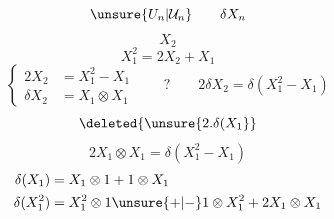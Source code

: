 \[\unsure{U_n|\mathcal U_n}\qquad\delta X_n\]
\[X_2\]
\[X_1^2=2X_2+X_1\]
\[
\left\{\begin{aligned}
2X_2&=X_1^2-X_1\\
\delta X_2&=X_1\otimes X_1
\end{aligned}\right.
\qquad ?\qquad 2\delta X_2=\delta(X_1^2-X_1)
\]
\[\deleted{\unsure{2.\delta(X_1}}\]
\[2X_1\otimes X_1=\delta(X_1^2-X_1)\]
\[
\begin{aligned}
\delta(X_1)&=X_1\otimes1+1\otimes X_1\\
\delta(X_1^2)&=X_1^2\otimes1\unsure{+|-}1\otimes X_1^2+2X_1\otimes X_1
\end{aligned}
\]
